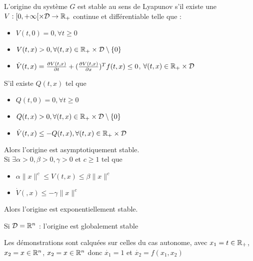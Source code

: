 \documentclass[main.tex]{subfiles} \newcommand{\D}{\mathcal{D}}
\begin{document}
\begin{thm} L'origine du système $G$ est stable au sens
de Lyapunov s'il existe une $V:[0,+\infty[ \times \D \rightarrow \R_+$ continue
et différentiable telle que : \begin{itemize} \item $V(t,0) = 0, \forall t\geq
			0$ \item $V(t,x) > 0, \forall (t,x) \in \R_+ \times \D \setminus
\{0\}$ \item $\dot{V}(t,x) = \derivp[V(t,x)]{t} + (\derivp[V(t,x)]{x})^Tf(t,x)
\leq 0$, $\forall (t,x) \in \R_+ \times \D$ \end{itemize}

  S'il existe $Q(t,x)$ tel que \begin{itemize} \item $Q(t,0)=0, \forall t \geq
  0$ \item $Q(t,x) > 0, \forall (t,x) \in \R_+ \times \D \setminus \{0\}$ \item
  $\dot{V}(t,x) \leq - Q(t,x), \forall (t,x) \in \R_+ \times \D$ \end{itemize}

  Alors l'origine est asymptotiquement stable.\\

  Si $\exists \alpha > 0, \beta > 0, \gamma > 0 \text{ et } c \geq 1 \text{ tel
  que }$ \begin{itemize} \item $\alpha \|x\|^c \leq V(t,x) \leq \beta \|x\|^c$
  \item $\dot{V}(,x) \leq - \gamma \|x\|^c$ \end{itemize}

  Alors l'origine est exponentiellement stable.

\end{thm}

\begin{rem} Si $\D = \R^n$ : l'origine est globalement stable \end{rem}


Les démonstrations sont calquées sur celles du cas autonome, avec $x_1 = t \in
\R_ +$, $x_2 = x \in \R^n$,  $x_2 = x \in \R^n$ donc $\dot{x_1} = 1$ et
$\dot{x_2} = f(x_1,x_2)$
\end{document}
